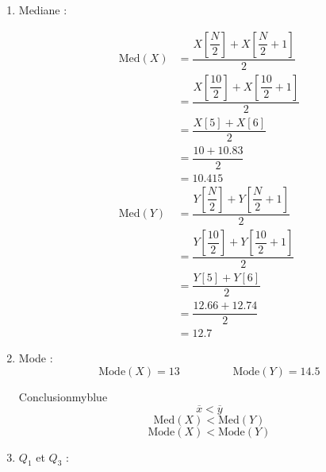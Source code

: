 \documentclass{article}
\begin{document}
\begin{enumerate}
\begin{enumerate}
            \item Mediane :

                \begin{align*}
                    \text{Med}(X) &= \dfrac{X\left[ \dfrac{N}{2}\right] + X\left[\dfrac{N}{2} + 1 \right]}{2}\\[0.15cm]
                                  &=\dfrac{X\left[ \dfrac{10}{2}\right] + X\left[\dfrac{10}{2} + 1 \right]}{2}\\[0.15cm]
                                  &=\dfrac{X\left[ 5 \right] + X\left[ 6 \right]}{2}\\[0.15cm]
                                  &=\dfrac{10+10.83}{2}\\[0.15cm]
                                  &= \boxed{10.415}\\[1cm]
                   \text{Med}(Y)  &= \dfrac{Y\left[ \dfrac{N}{2}\right] + Y\left[\dfrac{N}{2} + 1 \right]}{2}\\[0.15cm]
                                  &=\dfrac{Y\left[ \dfrac{10}{2}\right] + Y\left[\dfrac{10}{2} + 1 \right]}{2}\\[0.15cm]
                                  &=\dfrac{Y\left[ 5 \right] + Y\left[ 6 \right]}{2}\\[0.15cm]
                                  &=\dfrac{12.66+12.74}{2}\\[0.15cm]
                                  &= \boxed{12.7}
                \end{align*}

          \newpage
      \item Mode :
          \[\text{Mode}(X) = \boxed{13} \hspace{2cm} \text{Mode}(Y) = \boxed{14.5} \]

 
          \vspace{0.15cm}


          \begin{prettyBox}{Conclusion}{myblue}
              \[\overline{x} < \overline{y}\]
              \[\text{Med}(X) < \text{Med}(Y)\]
              \[\text{Mode}(X) < \text{Mode}(Y)\]
          \end{prettyBox}


          \vspace{0.15cm}


      \item \(Q_1\) et \(Q_3\) :
                

\end{enumerate}
\end{enumerate}
\end{document}
